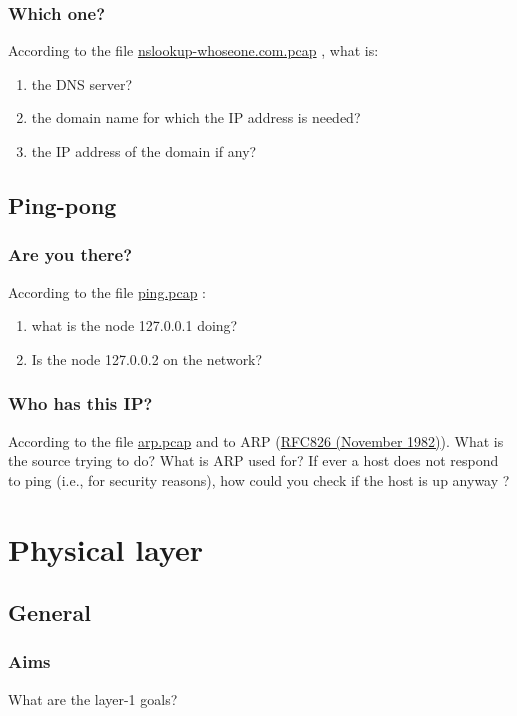 \documentclass[11pt]{article}
\begin{document}
\subsubsection{Which one?}
According to the file \color{blue}\href{http://teaching.auzias.net/db/nslookup-whoseone.com.pcap}{nslookup-whoseone.com.pcap} \color{black}, what is:
  \begin{enumerate}
    \item the DNS server?
    \item the domain name for which the IP address is needed?
    \item the IP address of the domain if any?
  \end{enumerate}

\subsection{Ping-pong}
\subsubsection{Are you there?}
According to the file \color{blue}\href{http://teaching.auzias.net/db/ping.pcap}{ping.pcap} \color{black}:
  \begin{enumerate}
    \item what is the node 127.0.0.1 doing?
    \item Is the node 127.0.0.2 on the network?
  \end{enumerate}
\subsubsection{Who has this IP?}
According to the file \color{blue}\href{http://teaching.auzias.net/db/arp.pcap}{arp.pcap} \color{black} and to ARP (\color{blue}\href{http://tools.ietf.org/html/rfc826}{RFC826 (November 1982)})\color{black}. What is the source trying to do? What is ARP used for? If ever a host does not respond to ping (i.e., for security reasons), how could you check if the host is up anyway ?


\section{Physical layer}
\subsection{General}
\subsubsection{Aims}
What are the layer-1 goals?
\end{document}
